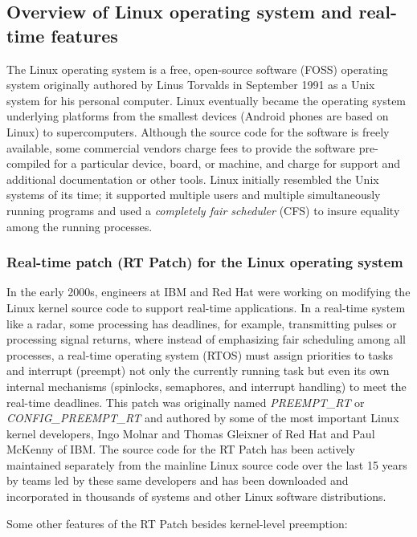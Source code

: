 \documentclass[12pt]{article}
\begin{document}
\subsection{Overview of Linux operating system and real-time features}
The Linux operating system is a free, open-source software (FOSS) operating
system originally authored by Linus Torvalds in September 1991 as a Unix system
for his personal computer.  Linux eventually became the operating system
underlying platforms from the smallest devices (Android phones are based on
Linux) to supercomputers. Although the source code for the software is freely
available, some commercial vendors charge fees to provide the software
pre-compiled for a particular device, board, or machine, and charge for support
and additional documentation or other tools.  Linux initially resembled the Unix
systems of its time; it supported multiple users and multiple simultaneously
running programs and used a \emph{completely fair scheduler} (CFS) to insure
equality among the running processes.

\subsubsection{Real-time patch (RT Patch) for the Linux operating system}
\label{section:rt_patch}
In the early 2000s, engineers at IBM and Red Hat were working on modifying the
Linux kernel source code to support real-time applications.  In a real-time
system like a radar, some processing has deadlines, for example, transmitting
pulses or processing signal returns, where instead of emphasizing fair
scheduling among all processes, a real-time operating system (RTOS) must assign
priorities to tasks and interrupt (preempt) not only the currently running task
but even its own internal mechanisms (spinlocks, semaphores, and interrupt
handling) to meet the real-time deadlines.  This patch was originally named
\emph{PREEMPT\_RT} or \emph{CONFIG\_PREEMPT\_RT} and authored by some of the most
important Linux kernel developers, Ingo Molnar and Thomas Gleixner of Red Hat
and Paul McKenny of IBM.  The source code for the RT Patch has been actively
maintained separately from the mainline Linux source code over the last 15 years
by teams led by these same developers and has been downloaded and incorporated
in thousands of systems and other Linux software distributions.

Some other features of the RT Patch besides kernel-level preemption:
\end{document}
